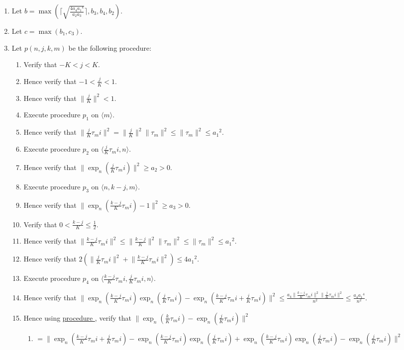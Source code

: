 \documentclass{article}
\newcounter{procedure}[part]
\newcommand{\procedurehr}[1]{\hyperref[sec:procedure #1]{procedure \expandafter\csname procedure#1\endcsname}}
\begin{document}
\begin{multicols}{2}
\begin{enumerate}
					\item Let $b=\max(\lceil\sqrt{\frac{4a_4{a_1}^4}{a_2a_3}}\rceil,b_3,b_4,b_2)$.
					\item Let $c=\max(b_1,c_3)$.
					\item Let $p(n,j,k,m)$ be the following procedure:
					\begin{enumerate}
						\item Verify that $-K<j<K$.
						\item Hence verify that $-1<\frac{j}{K}<1$.
						\item Hence verify that $\lVert\frac{j}{K}\rVert^2<1$.
						\item Execute procedure $p_1$ on $\langle m\rangle$.
						\item Hence verify that $\lVert\frac{j}{K}\tau_mi\rVert^2=\lVert\frac{j}{K}\rVert^2\lVert\tau_m\rVert^2\le\lVert\tau_m\rVert^2\le{a_1}^2$.
						\item Execute procedure $p_2$ on $\langle\frac{j}{K}\tau_mi,n\rangle$.
						\item Hence verify that $\lVert\exp_n(\frac{j}{K}\tau_mi)\rVert^2\ge a_2>0$.
						\item Execute procedure $p_3$ on $\langle n,k-j,m\rangle$.
						\item Hence verify that $\lVert\exp_n(\frac{k-j}{K}\tau_mi)-1\rVert^2\ge a_3>0$.
						\item Verify that $0<\frac{k-j}{K}\le\frac{1}{2}$.
						\item Hence verify that $\lVert\frac{k-j}{K}\tau_mi\rVert^2\le\lVert\frac{k-j}{K}\rVert^2\lVert\tau_m\rVert^2\le\lVert\tau_m\rVert^2\le{a_1}^2$.
						\item Hence verify that $2(\lVert\frac{j}{K}\tau_mi\rVert^2+\lVert\frac{k-j}{K}\tau_mi\rVert^2)\le 4{a_1}^2$.
						\item Execute procedure $p_4$ on $\langle\frac{k-j}{K}\tau_mi,\frac{j}{K}\tau_mi,n\rangle$.
						\item Hence verify that $\lVert\exp_n(\frac{k-j}{K}\tau_mi)\exp_n(\frac{j}{K}\tau_mi)-\exp_n(\frac{k-j}{K}\tau_mi+\frac{j}{K}\tau_mi)\rVert^2\le\frac{a_4\lVert\frac{k-j}{K}\tau_mi\rVert^2\lVert\frac{j}{K}\tau_mi\rVert^2}{n^2}\le\frac{a_4{a_1}^4}{n^2}$.
						\item Hence using \procedurehr{3.05}, verify that $\lVert\exp_n(\frac{k}{K}\tau_mi)-\exp_n(\frac{j}{K}\tau_mi)\rVert^2$
						\begin{enumerate}
							\item $=\lVert\exp_n(\frac{k-j}{K}\tau_mi+\frac{j}{K}\tau_mi)-\exp_n(\frac{k-j}{K}\tau_mi)\exp_n(\frac{j}{K}\tau_mi)+\exp_n(\frac{k-j}{K}\tau_mi)\exp_n(\frac{j}{K}\tau_mi)-\exp_n(\frac{j}{K}\tau_mi)\rVert^2$

\end{enumerate}
\end{enumerate}
\end{enumerate}
\end{multicols}
\end{document}
